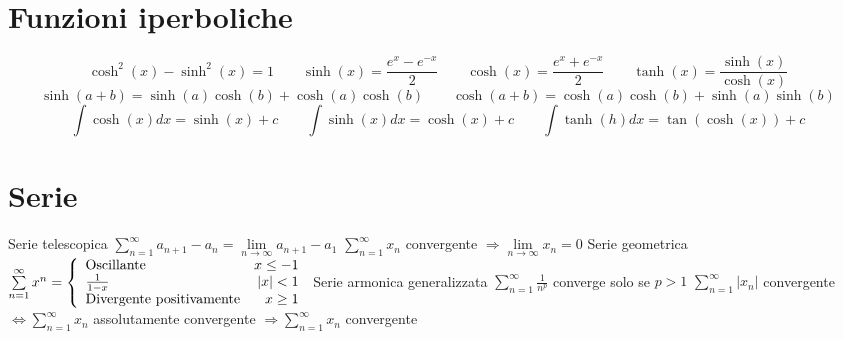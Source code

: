 \documentclass[]{article}
\newcommand{\serie}{\sum\limits_{n=1}^{\infty}}
\newcommand{\linf}{\lim\limits_{n \to \infty}}
\begin{document}
\section{Funzioni iperboliche}
\[
\cosh^2(x)-\sinh^2(x)=1 \qquad
\sinh(x)=\frac{e^x-e^{-x}}{2} \qquad
\cosh(x)=\frac{e^x+e^{-x}}{2} \qquad
\tanh(x)=\frac{\sinh(x)}{\cosh(x)}
\]
\[
\sinh(a+b)=\sinh(a)\cosh(b)+\cosh(a)\cosh(b) \qquad
\cosh(a+b)=\cosh(a)\cosh(b)+\sinh(a)\sinh(b)
\]
\[
\int \cosh(x) dx=\sinh(x)+c \qquad
\int \sinh(x) dx=\cosh(x)+c \qquad
\int \tanh(h) dx=\tan(\cosh(x))+c
\]

\section{Serie}

Serie telescopica \(\serie a_{n+1}-a_n=\linf a_{n+1}-a_1\)\newline
\(\serie x_n\) convergente \(\Rightarrow \lim\limits_{n\to\infty} x_n=0\)\newline
Serie geometrica \(\serie x^n=\left\{\begin{array}{lr}
\textnormal{Oscillante} & x\leq -1 \\
\frac{1}{1-x} & |x|<1\\
\textnormal{Divergente positivamente} & x\geq 1
\end{array}\right.\)\newline
Serie armonica generalizzata \(\serie \frac{1}{n^p}\) converge solo se \(p>1\)\newline
\(\serie |x_n|\) convergente \(\Leftrightarrow  \serie x_n\) assolutamente convergente \(\Rightarrow \serie x_n\) convergente\newline
\end{document}
